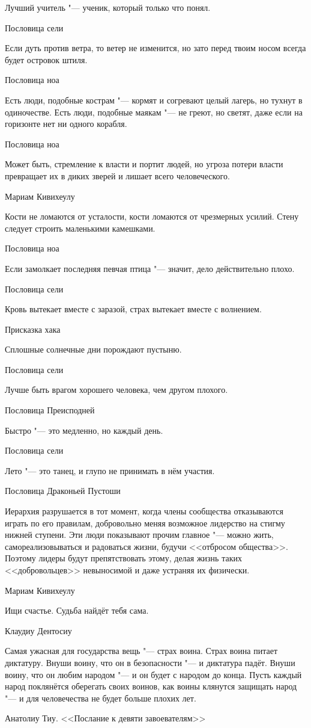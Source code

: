 \epigraph
{Лучший учитель "--- ученик, который только что понял.}
{Пословица сели}

\epigraph
{Если дуть против ветра, то ветер не изменится, но зато перед твоим носом всегда будет островок штиля.}
{Пословица ноа}

\epigraph
{Есть люди, подобные кострам "--- кормят и согревают целый лагерь, но тухнут в одиночестве.
Есть люди, подобные маякам "--- не греют, но светят, даже если на горизонте нет ни одного корабля.}
{Пословица ноа}

\epigraph
{Может быть, стремление к власти и портит людей, но угроза потери власти превращает их в диких зверей и лишает всего человеческого.}
{Мариам Кивихеулу}

\epigraph
{Кости не ломаются от усталости, кости ломаются от чрезмерных усилий.
Стену следует строить маленькими камешками.}
{Пословица ноа}

\epigraph
{Если замолкает последняя певчая птица "--- значит, дело действительно плохо.}
{Пословица сели}

\epigraph
{Кровь вытекает вместе с заразой, страх вытекает вместе с волнением.}
{Присказка хака}

\epigraph
{Сплошные солнечные дни порождают пустыню.}
{Пословица сели}

\epigraph
{Лучше быть врагом хорошего человека, чем другом плохого.}
{Пословица Преисподней}

\epigraph
{Быстро "--- это медленно, но каждый день.}
{Пословица сели}

\epigraph
{Лето "--- это танец, и глупо не принимать в нём участия.}
{Пословица Драконьей Пустоши}

\epigraph
{Иерархия разрушается в тот момент, когда члены сообщества отказываются играть по его правилам, добровольно меняя возможное лидерство на стигму нижней ступени.
Эти люди показывают прочим главное "--- можно жить, самореализовываться и радоваться жизни, будучи <<отбросом общества>>.
Поэтому лидеры будут препятствовать этому, делая жизнь таких <<добровольцев>> невыносимой и даже устраняя их физически.}
{Мариам Кивихеулу}

\epigraph
{Ищи счастье.
Судьба найдёт тебя сама.}
{Клаудиу Дентосиу}

\epigraph
{Самая ужасная для государства вещь "--- страх воина.
Страх воина питает диктатуру.
Внуши воину, что он в безопасности "--- и диктатура падёт.
Внуши воину, что он любим народом "--- и он будет с народом до конца.
Пусть каждый народ поклянётся оберегать своих воинов, как воины клянутся защищать народ "--- и для человечества не будет больше плохих лет.}
{Анатолиу Тиу.
<<Послание к девяти завоевателям>>}

